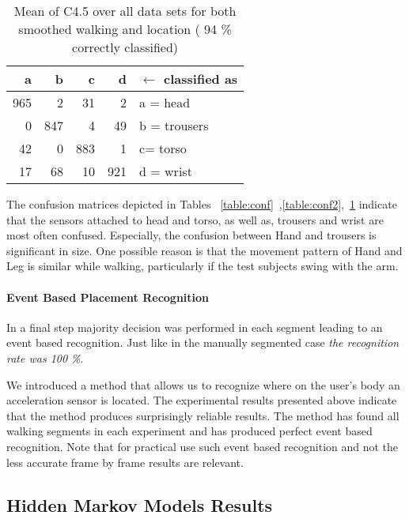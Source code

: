 \begin{table}[h]
\caption[Mean confusion matrix with smoothing]{Mean of C4.5 over all data sets for both smoothed walking and location ( 94 \% correctly classified)}
\begin{center}
\begin{tabular}{|r r r r l|}\midrule
a       &b       &c      &d     & $\gets$ classified as\\\midrule
965     &2       &31     &2     &a = head\\
0       &847     &4      &49    &b = trousers\\
42      &0       &883    &1     &c= torso\\
17      &68      &10     &921   &d = wrist\\
\bottomrule
\end{tabular}
\label{table:conf3}
\end{center}
\end{table}

The confusion matrices depicted in Tables
~\ref{table:conf}~,\ref{table:conf2},~\ref{table:conf3} indicate that
the sensors attached to head and torso, as well as, trousers and
wrist are most often confused.  Especially, the confusion between Hand
and trousers is significant in size.  One possible reason is that the
movement pattern of Hand and Leg is similar while walking,
particularly if the test subjects swing with the arm.

\paragraph{Event Based Placement Recognition}
In a final step majority decision was performed in each segment leading
to an event based recognition. Just like in the manually segmented case
{\em the recognition rate was 100 \%}. 

We introduced a method that allows us to recognize where on the
user's body an acceleration sensor is located. The experimental
results presented above indicate that the method produces surprisingly
reliable results. The method has found all walking segments in each
experiment and has produced perfect event based recognition. Note that
for practical use such event based recognition and not the less
accurate frame by frame results are relevant.


\subsection{Hidden Markov Models Results}

